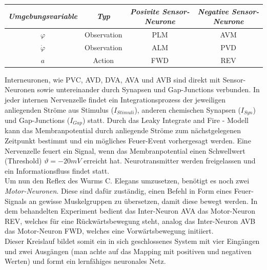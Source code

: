 	\begin{center}
	\begin{tabular}{c@{\hskip 0.5cm}c@{\hskip 0.5cm}c@{\hskip 0.5cm}c}    \toprule
		\setlength{\tabcolsep}{50pt}
		\renewcommand{\arraystretch}{1.5}
		\emph{Umgebungsvariable} & \emph{Typ}  & \emph{Posivite Sensor-Neurone} & \emph{Negative Sensor-Neurone} \\\midrule
		$\varphi$ 				 & Observation & PLM							& AVM							 \\ 
		$\dot{\varphi}$		 	 & Observation & ALM							& PVD							 \\
		$a$						 & Action	   & FWD							& REV							 \\\bottomrule
		\hline
	\end{tabular}
	\end{center}
	Interneuronen, wie PVC, AVD, DVA, AVA und AVB sind direkt mit Sensor-Neuronen sowie untereinander durch Synapsen und Gap-Junctions verbunden. In jeder internen Nervenzelle findet ein Integrationsprozess der jeweiligen anliegenden Ströme aus Stimulus ($I_{Stimuli}$), anderen chemischen Synapsen ($I_{Syn}$) und Gap-Junctions ($I_{Gap}$) statt. Durch das Leaky Integrate and Fire - Modell kann das Membranpotential durch anliegende Ströme zum nächstgelegenen Zeitpunkt bestimmt und ein mögliches Feuer-Event vorhergesagt werden. Eine Nervenzelle feuert ein Signal, wenn das Membranpotential einen Schwellwert (\glqq Threshold\grqq) $\vartheta = -20mV$ erreicht hat. Neurotransmitter werden freigelassen und ein Informationsfluss findet statt.\\
	Um nun den Reflex des Wurms C. Elegans umzusetzen, benötigt es noch zwei \textit{Motor-Neuronen}. Diese sind dafür zuständig, einen Befehl in Form eines Feuer-Signals an gewisse Muskelgruppen zu übersetzen, damit diese bewegt werden. In dem behandelten Experiment bedient das Inter-Neuron AVA das Motor-Neuron REV, welches für eine Rückwärtsbewegung steht, analog das Inter-Neuron AVB das Motor-Neuron FWD, welches eine Vorwärtsbewegung initiiert.\\
	Dieser Kreislauf bildet somit ein in sich geschlossenes System mit vier Eingängen und zwei Ausgängen (man achte auf das Mapping mit positiven und negativen Werten) und formt ein lernfähiges neuronales Netz.
